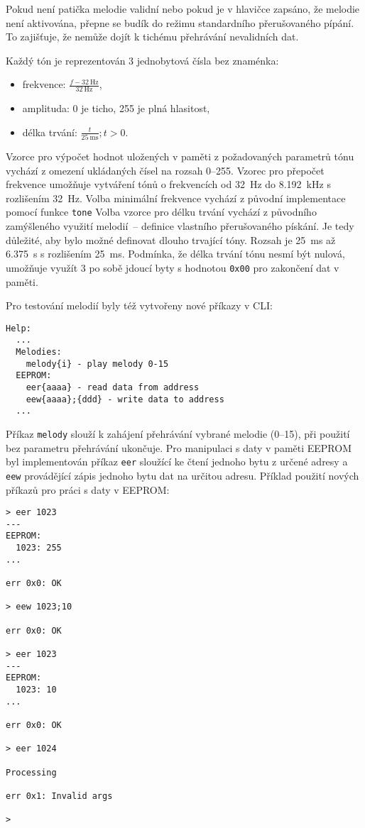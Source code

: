 Pokud není patička melodie validní nebo pokud je v hlavičce zapsáno, že melodie
není aktivována, přepne se budík do režimu standardního přerušovaného pípání.
To zajišťuje, že nemůže dojít k tichému přehrávání nevalidních dat.

Každý tón je reprezentován 3 jednobytová čísla bez znaménka:
\begin{itemize}[nosep]
    \item frekvence: $\frac{f - \SI{32}{\hertz}}{\SI{32}{\hertz}}$,
    \item amplituda: \num{0} je ticho, \num{255} je plná hlasitost,
    \item délka trvání: $\frac{t}{\SI{25}{\milli\second}}; t > 0$.
\end{itemize}

Vzorce pro výpočet hodnot uložených v paměti z požadovaných parametrů tónu
vychází z omezení ukládaných čísel na rozsah \numrange{0}{255}.
Vzorec pro přepočet frekvence umožňuje vytváření tónů o frekvencích od
\SI{32}{\hertz} do \SI{8,192}{\kilo\hertz} s rozlišením \SI{32}{\hertz}.
Volba minimální frekvence vychází z původní implementace pomocí funkce \verb|tone|
Volba vzorce pro délku trvání vychází z původního zamýšleného využití
melodií~-- definice vlastního přerušovaného pískání. Je tedy důležité, aby bylo
možné definovat dlouho trvající tóny. Rozsah je \SI{25}{\milli\second} až
\SI{6,375}{\second} s rozlišením \SI{25}{\milli\second}. Podmínka, že délka
trvání tónu nesmí být nulová, umožňuje využít 3 po sobě jdoucí byty s hodnotou
\texttt{0x00} pro zakončení dat v paměti.

Pro testování melodií byly též vytvořeny nové příkazy v CLI:
\begin{lstlisting}[basicstyle=\ttfamily]
Help:
  ...
  Melodies:
    melody{i} - play melody 0-15
  EEPROM:
    eer{aaaa} - read data from address
    eew{aaaa};{ddd} - write data to address
  ...
\end{lstlisting}

Příkaz \verb|melody| slouží k zahájení přehrávání vybrané melodie
(\numrange{0}{15}), při použití bez parametru přehrávání ukončuje.
Pro manipulaci s daty v paměti EEPROM byl implementován příkaz
\verb|eer| sloužící ke čtení jednoho bytu z určené adresy a \verb|eew|
provádějící zápis jednoho bytu dat na určitou adresu. Příklad použití nových
příkazů pro práci s daty v EEPROM:
\begin{lstlisting}[basicstyle=\ttfamily\singlespacing]
> eer 1023
---
EEPROM:
  1023: 255
...

err 0x0: OK

> eew 1023;10

err 0x0: OK

> eer 1023
---
EEPROM:
  1023: 10
...

err 0x0: OK

> eer 1024

Processing

err 0x1: Invalid args

>
\end{lstlisting}

